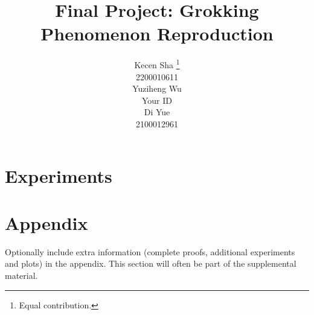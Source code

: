 \documentclass{article}
\title{Final Project: Grokking Phenomenon Reproduction}
\author{%
  Kecen Sha \thanks{Equal contribution.} \\
  2200010611\\
  \And
  Yuziheng Wu \footnotemark[1]\\
  Your ID \\
  \And
  Di Yue \footnotemark[1]\\
  2100012961 \\
}
\theoremstyle{definition}
\begin{document}
\maketitle







\section{Experiments}









\begin{small}	
    
\end{small}




\appendix


\section{Appendix}


Optionally include extra information (complete proofs, additional experiments and plots) in the appendix.
This section will often be part of the supplemental material.
\end{document}
